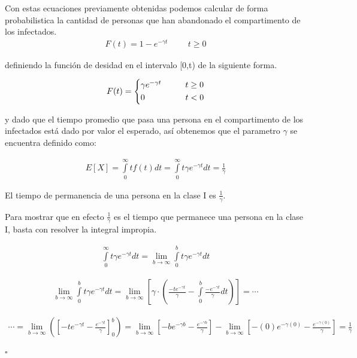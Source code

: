 Con estas ecuaciones previamente obtenidas podemos calcular de forma probabilistica la cantidad de personas que han abandonado el compartimento de los infectados.
\begin{align}
F(t) = 1 -  e^{-\gamma t} \hspace{1cm} t \geq  0
\end{align}

definiendo la función de desidad en el intervalo [0,t) de la siguiente forma.

\begin{equation*}
F(t) =
\begin{cases*}
\gamma e^{-\gamma t} \hspace{1cm} t \geq  0 \\
0 \hspace{1.7cm} t <  0
\end{cases*}
\end{equation*}

y dado que el tiempo promedio que pasa una persona en el compartimento de los infectados está dado por valor el esperado, así obtenemos que el parametro $\gamma$ se encuentra definido como:

\begin{align}
E[X] = \int \limits_{0}^{\infty} tf(t)dt = \int \limits_{0}^{\infty} t\gamma e^{-\gamma t} dt = \frac{1}{\gamma}
\end{align}

\begin{Af}
El tiempo de permanencia de una persona en la clase I es $\frac{1}{\gamma}$. \cite{Martcheva}
\end{Af}

\begin{Dem}

Para mostrar que en efecto $\frac{1}{\gamma}$ es el tiempo que permanece una persona en la clase I, basta con resolver la integral impropia.

\begin{align*} 
\int \limits_{0}^{\infty} t\gamma e^{-\gamma t} dt = \lim\limits_{b\rightarrow \infty} \int \limits_{0}^{b} t\gamma e^{-\gamma t}dt 
\end{align*}

\begin{align*}
\lim\limits_{b\rightarrow \infty} \int \limits_{0}^{b} t\gamma e^{-\gamma t}dt = \lim\limits_{b\rightarrow \infty} \left[ \gamma \cdot \left( \frac{-t e^{-\gamma t}}{\gamma} - \int \limits_{0}^{b} \frac{-e^{-\gamma t}}{\gamma} dt \right)\right] = \cdots
\end{align*}

\begin{align*}
\cdots = \lim\limits_{b\rightarrow \infty} \left( \left[ -te^{- \gamma t} - \frac{e^{-\gamma t}}{\gamma} \right]_0^b \right) = \lim\limits_{b\rightarrow \infty} \left[ -be^{- \gamma b} - \frac{e^{- \gamma b}}{\gamma} \right] - \lim\limits_{b\rightarrow \infty} \left[ -(0)e^{- \gamma (0)} - \frac{e^{- \gamma (0)}}{\gamma} \right] = \frac{1}{\gamma}  \\
\end{align*}

\hfill	$\square$

\end{Dem}

